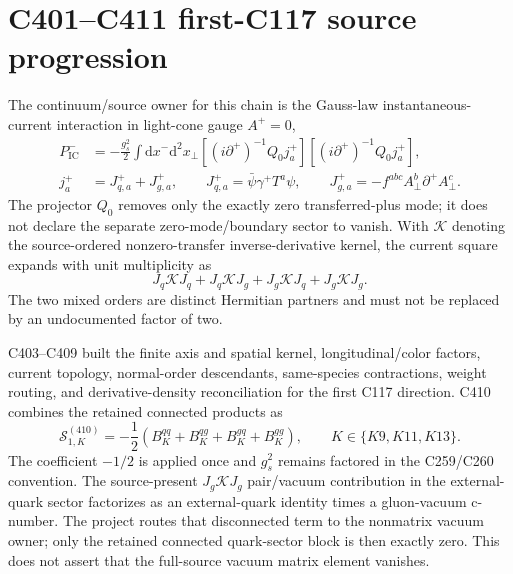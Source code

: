 \documentclass[11pt,oneside]{book}
\newcommand{\dd}{\mathrm{d}}
\begin{document}
\section{C401--C411 first-C117 source progression}

The continuum/source owner for this chain is the Gauss-law instantaneous-current interaction in light-cone gauge $A^+=0$,
\begin{align}
 P^-_{\mathrm{IC}}
 &=-\frac{g_s^2}{2}\int\dd x^-\dd^2x_\perp
 \left[(i\partial^+)^{-1}Q_0j_a^+\right]
 \left[(i\partial^+)^{-1}Q_0j_a^+\right],
 \label{eq:c117-source-operator}\\
 j_a^+&=J_{q,a}^++J_{g,a}^+,
 \qquad J_{q,a}^+=\bar\psi\gamma^+T^a\psi,
 \qquad J_{g,a}^+=-f^{abc}A_\perp^b\partial^+A_\perp^c.
 \label{eq:c117-current-decomposition}
\end{align}
The projector $Q_0$ removes only the exactly zero transferred-plus mode; it does not declare the separate zero-mode/boundary sector to vanish.  With $\mathcal K$ denoting the source-ordered nonzero-transfer inverse-derivative kernel, the current square expands with unit multiplicity as
\begin{equation}
 J_q\mathcal KJ_q+J_q\mathcal KJ_g
 +J_g\mathcal KJ_q+J_g\mathcal KJ_g.
 \label{eq:c117-four-products}
\end{equation}
The two mixed orders are distinct Hermitian partners and must not be replaced by an undocumented factor of two.

C403--C409 built the finite axis and spatial kernel, longitudinal/color factors, current topology, normal-order descendants, same-species contractions, weight routing, and derivative-density reconciliation for the first C117 direction.  C410 combines the retained connected products as
\begin{equation}
 \mathcal S_{1,K}^{(410)}
 =-\frac12\left(B_K^{qq}+B_K^{qg}+B_K^{gq}+B_K^{gg}\right),
 \qquad K\in\{K9,K11,K13\}.
 \label{eq:c410-retained-aggregate}
\end{equation}
The coefficient $-1/2$ is applied once and $g_s^2$ remains factored in the C259/C260 convention.  The source-present $J_g\mathcal KJ_g$ pair/vacuum contribution in the external-quark sector factorizes as an external-quark identity times a gluon-vacuum c-number.  The project routes that disconnected term to the nonmatrix vacuum owner; only the retained connected quark-sector block is then exactly zero.  This does not assert that the full-source vacuum matrix element vanishes.
\end{document}
